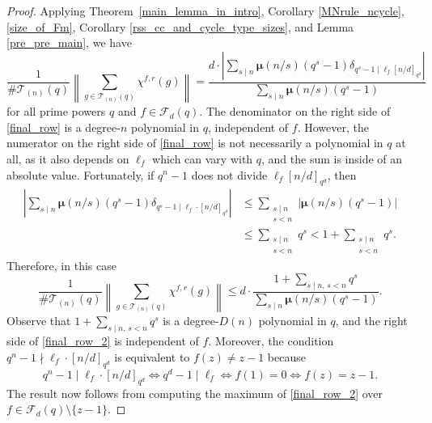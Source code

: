\documentclass[10pt]{article}
\theoremstyle{definition}
\newcommand{\CF}{\mathcal{F}}
\newcommand{\CT}{\mathcal{T}}
\newcommand{\moebius}{\pmb{\mu}}
\begin{document}
\begin{proof}
Applying Theorem~\ref{main_lemma_in_intro}, Corollary \ref{MNrule_ncycle}, \eqref{size_of_Fm}, Corollary \ref{rss_cc_and_cycle_type_sizes}, and Lemma \ref{pre_pre_main}, we have
\begin{equation}
\label{final_row}
\frac{
1
}{
\# \CT_{(n)} (q)
}
\left \|
\sum_{g \in \CT_{(n)} (q)} \chi^{f,r} (g)
\right \|
=
\frac{d \cdot \left | \sum_{s \mid n} \moebius(n/s)(q^s-1) \delta_{q^s - 1 \mid \ell_{f} [n/d]_{q^d}} \right | }{\sum_{s \mid n} \moebius(n/s)(q^s-1)}
\end{equation}
for all prime powers \(q\) and \(f \in \CF_d (q)\).
The denominator on the right side of \eqref{final_row} is a degree-\(n\) polynomial in \(q\), independent of \(f\).
However, the numerator on the right side of \eqref{final_row} is not necessarily a polynomial in \(q\) at all, as it also depends on \(\ell_{f}\) which can vary with \(q\), and the sum is inside of an absolute value.
Fortunately, if \(q^n - 1\) does not divide \(\ell_{f} [n/d]_{q^d}\), then
\begin{equation}
\label{D_n_bound}
\begin{aligned}
\left | \sum_{s \mid n} \moebius(n/s) (q^s-1) \delta_{q^s-1 \mid \ell_f \cdot [n/d]_{q^d}} \right |
& \leq
\sum_{\substack{s \mid n \\ s < n}}
\left | \moebius (n/s) (q^s-1) \right | \\
& \leq
\sum_{\substack{s \mid n \\ s < n}}
q^s
<
1 + \sum_{\substack{s \mid n \\ s < n}}
q^s.
\end{aligned}
\end{equation}
Therefore, in this case
\begin{equation}
\label{final_row_2}
\frac{
1
}{
\# \CT_{(n)} (q)
}
\left \|
\sum_{g \in \CT_{(n)} (q)} \chi^{f,r} (g)
\right \|
\leq
d \cdot \frac{1 + \sum_{s \mid n, \, s< n} q^s }{\sum_{s \mid n} \moebius(n/s)(q^s-1)}.
\end{equation}
Observe that \(1 + \sum_{s \mid n, \, s < n} q^s\) is a degree-\(D(n)\) polynomial in \(q\), and the right side of \eqref{final_row_2} is independent of \(f\).
Moreover, the condition \(q^n-1 \nmid \ell_f \cdot [n/d]_{q^d}\) is equivalent to \(f(z) \neq z-1\) because
\[
q^n-1 \mid \ell_f \cdot [n/d]_{q^d}
\iff q^d-1 \mid \ell_f
\iff f(1) = 0
\iff f(z) = z-1.
\]
The result now follows from computing the maximum of \eqref{final_row_2} over \mbox{\(f \in \CF_d(q) \setminus \{z-1\}\).}
\end{proof}
\end{document}
